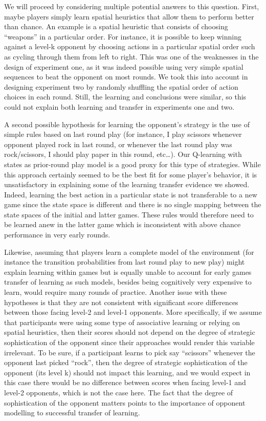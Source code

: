 \documentclass[man,floatsintext]{apa6}
\begin{document}
We will proceed by considering multiple potential answers to this question. First, maybe players simply learn spatial heuristics that allow them to perform better than chance. An example is a spatial heuristic that consists of choosing \enquote{weapons} in a particular order. For instance, it is possible to keep winning against a level-k opponent by choosing actions in a particular spatial order such as cycling through them from left to right. This was one of the weaknesses in the design of experiment one, as it was indeed possible using very simple spatial sequences to beat the opponent on most rounds. We took this into account in designing experiment two by randomly shuffling the spatial order of action choices in each round. Still, the learning and conclusions were similar, so this could not explain both learning and transfer in experiments one and two.

A second possible hypothesis for learning the opponent's strategy is the use of simple rules based on last round play (for instance, I play scissors whenever opponent played rock in last round, or whenever the last round play was rock/scissors, I should play paper in this round, etc\ldots{}). Our Q-learning with states as prior-round play model is a good proxy for this type of strategies. While this approach certainly seemed to be the best fit for some player's behavior, it is unsatisfactory in explaining some of the learning transfer evidence we showed. Indeed, learning the best action in a particular state is not transferable to a new game since the state space is different and there is no single mapping between the state spaces of the initial and latter games. These rules would therefore need to be learned anew in the latter game which is inconsistent with above chance performance in very early rounds.

Likewise, assuming that players learn a complete model of the environment (for instance the transition probabilities from last round play to new play) might explain learning within games but is equally unable to account for early games transfer of learning as such models, besides being cognitively very expensive to learn, would require many rounds of practice. Another issue with these hypotheses is that they are not consistent with significant score differences between those facing level-2 and level-1 opponents. More specifically, if we assume that participants were using some type of associative learning or relying on spatial heuristics, then their scores should not depend on the degree of strategic sophistication of the opponent since their approaches would render this variable irrelevant. To be sure, if a participant learns to pick say \enquote{scissors} whenever the opponent last picked \enquote{rock}, then the degree of strategic sophistication of the opponent (its level k) should not impact this learning, and we would expect in this case there would be no difference between scores when facing level-1 and level-2 opponents, which is not the case here. The fact that the degree of sophistication of the opponent matters points to the importance of opponent modelling to successful transfer of learning.
\end{document}
